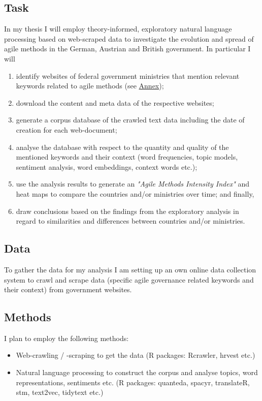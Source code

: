 \documentclass[a4paper]{article}
\begin{document}
\begin{spacing}{1.5}
\subsection*{Task}
In my thesis I will employ theory-informed, exploratory natural language processing based on web-scraped data to investigate the evolution and spread of agile methods in the German, Austrian and British government. In particular I will
\begin{enumerate}
  \setlength\itemsep{0.01em}
    \item identify websites of federal government ministries that mention relevant keywords related to agile methods (see \hyperref[Annex]{Annex});
    \item download the content and meta data of the respective websites;
    \item generate a corpus database of the crawled text data including the date of creation for each web-document;
    \item analyse the database with respect to the quantity and quality of the mentioned keywords and their context (word frequencies, topic models, sentiment analysis, word embeddings, context words etc.); 
    \item use the analysis results to generate an \textit{"Agile Methods Intensity Index"} and heat maps to compare the countries and/or ministries over time; and finally,
    \item draw conclusions based on the findings from the exploratory analysis in regard to similarities and differences between countries and/or ministries.
\end{enumerate}
%
%
\subsection*{Data}
To gather the data for my analysis I am setting up an own online data collection system to crawl and scrape data (specific agile governance related keywords and their context) from government websites.

%
\subsection*{Methods}
I plan to employ the following methods:
\begin{itemize}
  \setlength\itemsep{0.01em}
    \item Web-crawling / -scraping to get the data (R packages: Rcrawler, hrvest etc.)
    \item Natural language processing to construct the corpus and analyse topics, word representations, sentiments etc. (R packages: quanteda, spacyr, translateR, stm, text2vec, tidytext etc.)
\end{itemize}


\end{spacing}
\end{document}
